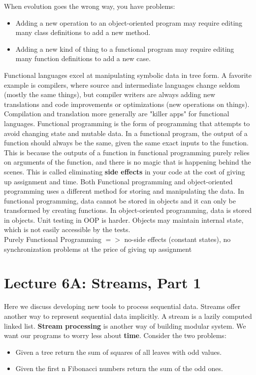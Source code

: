 \documentclass[a4paper,twoside]{article}
\numberwithin{equation}{section}
\begin{document}
When evolution goes the wrong way, you have problems:
\begin{itemize}
    \item Adding a new operation to an object-oriented program may require editing many class
          definitions to add a new method.
    \item Adding a new kind of thing to a functional program may require editing many function
          definitions to add a new case.
\end{itemize}
Functional languages excel at manipulating symbolic data in tree form. A favorite example is compilers,
where source and intermediate languages change seldom (mostly the same things), but compiler writers
are always adding new translations and code improvements or optimizations (new operations on things).
Compilation and translation more generally are "killer apps" for functional languages.
Functional programming is the form of programming that attempts to avoid changing state and mutable
data. In a functional program, the output of a function should always be the same, given the same exact
inputs to the function. This is because the outputs of a function in functional programming purely
relies on arguments of the function, and there is no magic that is happening behind the scenes.
This is called eliminating \textbf{side effects} in your code at the cost of giving up assignment and
time. Both Functional programming and object-oriented
programming uses a different method for storing and manipulating the data.
In functional programming, data cannot be stored in objects and it can only be transformed by
creating functions. In object-oriented programming, data is stored in objects.
Unit testing in OOP is harder. Objects may maintain internal state, which is not easily accessible by the tests.\\
Purely Functional Programming $=>$ no-side effects (constant states), no synchronization problems
at the price of giving up assignment

\section{Lecture 6A: Streams, Part 1}
Here we discuss developing new tools to process sequential data.
Streams offer another way to represent sequential data implicitly. A stream is a lazily computed linked list.
\textbf{Stream processing} is another way of building modular system. We want our programs to worry
less about \textbf{time}. Consider the two problems:
\begin{itemize}
    \item Given a tree return the sum of squares of all leaves with odd values.
    \item Given the first n Fibonacci numbers return the sum of the odd ones.
\end{itemize}
\end{document}
